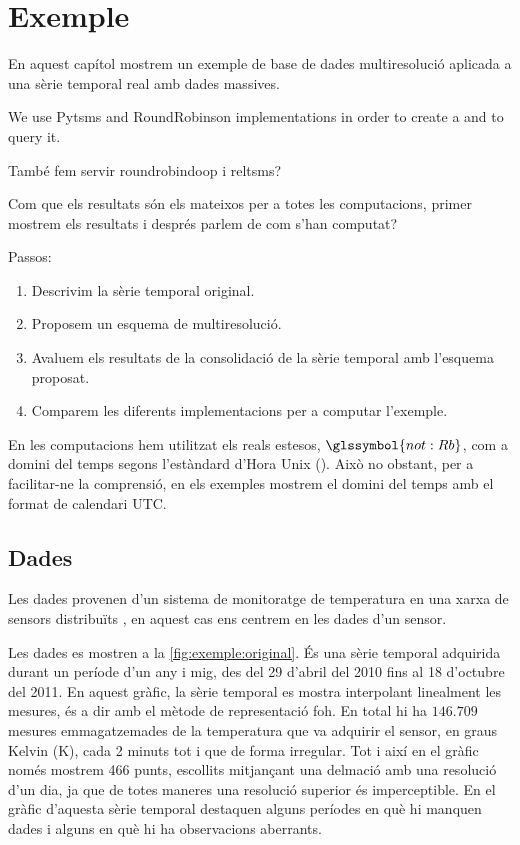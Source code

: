 \chapter{Exemple}
\label{sec:implementacions:exemple}

En aquest capítol mostrem un exemple de base de dades multiresolució
aplicada a una sèrie temporal real amb dades massives.  

We use Pytsms and
RoundRobinson implementations in order to create a  and
to query it.

També fem servir roundrobindoop i reltsms?

Com que els resultats són
els mateixos per a totes les computacions, primer mostrem els
resultats i després parlem de com s'han computat?

Passos:

\begin{enumerate}
\item Descrivim la sèrie temporal original.
\item Proposem un esquema de multiresolució.
\item Avaluem els resultats de la consolidació de la sèrie temporal
  amb l'esquema proposat.
\item Comparem les diferents implementacions per a computar l'exemple.
\end{enumerate}


En les computacions hem utilitzat els reals estesos,
$\glssymbol{not:Rb}$, com a domini del temps segons l'estàndard d'Hora
Unix (). Això no obstant, per a facilitar-ne la
comprensió, en els exemples mostrem el domini del temps amb el format
de calendari \gls{UTC}.




\section{Dades}


Les dades provenen d'un sistema de monitoratge de temperatura en una
xarxa de sensors distribuïts \parencite{alippi10}, en aquest cas ens
centrem en les dades d'un sensor.

Les dades es mostren a la \autoref{fig:exemple:original}.  És una
sèrie temporal adquirida durant un període d'un any i mig, des del 29
d'abril del 2010 fins al 18 d'octubre del 2011. En aquest gràfic, la
sèrie temporal es mostra interpolant linealment les mesures, és a dir
amb el mètode de representació \gls{foh}.  
%
En total hi ha $146.709$
mesures emmagatzemades de la temperatura que va adquirir el sensor, en
graus Kelvin (K), cada 2 minuts tot i que de forma irregular.  Tot i
així en el gràfic només mostrem 466 punts, escollits mitjançant una
delmació amb una resolució d'un dia, ja que de totes maneres una
resolució superior és imperceptible.  En el gràfic d'aquesta sèrie
temporal destaquen alguns períodes en què hi manquen dades i alguns en
què hi ha observacions aberrants.


